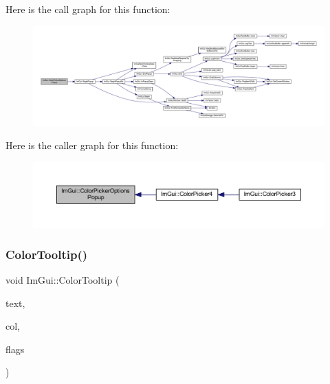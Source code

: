 Here is the call graph for this function\+:
\nopagebreak
\begin{figure}[H]
\begin{center}
\leavevmode
\includegraphics[width=350pt]{namespace_im_gui_a6d112eeb6d8ffdebbc9d9a8c66babbee_cgraph}
\end{center}
\end{figure}
Here is the caller graph for this function\+:
\nopagebreak
\begin{figure}[H]
\begin{center}
\leavevmode
\includegraphics[width=350pt]{namespace_im_gui_a6d112eeb6d8ffdebbc9d9a8c66babbee_icgraph}
\end{center}
\end{figure}
\mbox{\label{namespace_im_gui_afad90b366b6471e3b13175c0ebeb26c8}} 
\subsubsection{\texorpdfstring{Color\+Tooltip()}{ColorTooltip()}}
{\footnotesize\ttfamily void Im\+Gui\+::\+Color\+Tooltip (\begin{DoxyParamCaption}\item[{const char $\ast$}]{text,  }\item[{const float $\ast$}]{col,  }\item[{\mbox{\hyperlink{imgui_8h_a6b2d5e95adc38f22c021252189f669c6}{Im\+Gui\+Color\+Edit\+Flags}}}]{flags }\end{DoxyParamCaption})}

